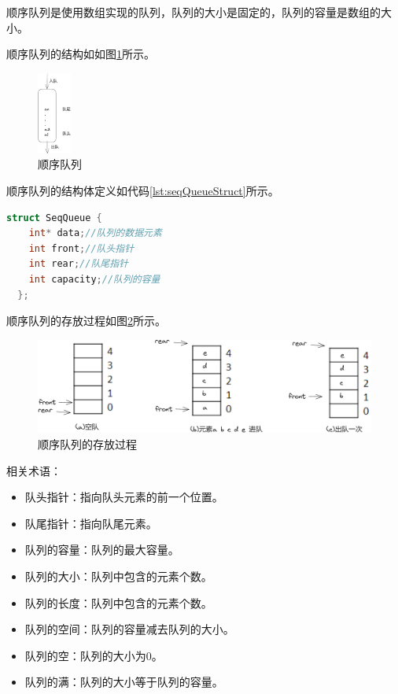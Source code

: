 \documentclass[lang=cn,newtx,10pt,scheme=chinese]{../elegantbook}
\begin{document}
顺序队列是使用数组实现的队列，队列的大小是固定的，队列的容量是数组的大小。

顺序队列的结构如如图\ref{fig:seqQueue}所示。

\begin{figure}[h!]
  \centering
  \includegraphics[width=0.1\textwidth]{./figure/pdf/cropped/seqQueue.pdf}
  \caption{顺序队列}
  \label{fig:seqQueue}
\end{figure}

顺序队列的结构体定义如代码\ref{lst:seqQueueStruct}所示。

\begin{lstlisting}[language=C++, caption={顺序队列结构体定义}, label={lst:seqQueueStruct}]
  struct SeqQueue {
    int* data;//队列的数据元素
    int front;//队头指针
    int rear;//队尾指针
    int capacity;//队列的容量
  };
\end{lstlisting}


顺序队列的存放过程如图\ref{fig:seqQueuePut}所示。

\begin{figure}[h]
  \centering
  \includegraphics[width=1\textwidth]{./figure/pdf/cropped/seqQueuePut.pdf}
  \caption{顺序队列的存放过程}
  \label{fig:seqQueuePut}
\end{figure}

相关术语：

\begin{itemize}
  \item 队头指针：指向队头元素的前一个位置。
  \item 队尾指针：指向队尾元素。
  \item 队列的容量：队列的最大容量。
  \item 队列的大小：队列中包含的元素个数。
  \item 队列的长度：队列中包含的元素个数。
  \item 队列的空间：队列的容量减去队列的大小。
  \item 队列的空：队列的大小为0。
  \item 队列的满：队列的大小等于队列的容量。
\end{itemize}
\end{document}

